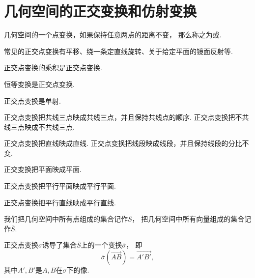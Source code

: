 \section{几何空间的正交变换和仿射变换}
\begin{definition}
几何空间的一个点变换，如果保持任意两点的距离不变，
那么称之为或.
\end{definition}

常见的正交点变换有平移、绕一条定直线旋转、关于给定平面的镜面反射等.

\begin{property}
正交点变换的乘积是正交点变换.
\end{property}

\begin{property}
恒等变换是正交点变换.
\end{property}

\begin{property}
正交点变换是单射.
\end{property}

\begin{property}
正交点变换把共线三点映成共线三点，并且保持共线点的顺序.
正交点变换把不共线三点映成不共线三点.
\end{property}

\begin{property}
正交点变换把直线映成直线.
正交点变换把线段映成线段，并且保持线段的分比不变.
\end{property}

\begin{property}
正交变换把平面映成平面.
\end{property}

\begin{property}
正交点变换把平行平面映成平行平面.
\end{property}

\begin{property}
正交点变换把平行直线映成平行直线.
\end{property}

我们把几何空间中所有点组成的集合记作\(S\)，
把几何空间中所有向量组成的集合记作\(\overline{S}\).
\begin{property}
正交点变换\(\sigma\)诱导了集合\(\overline{S}\)上的一个变换\(\overline{\sigma}\)，
即\begin{equation*}
	\overline{\sigma}(\vec{AB}) = \vec{A'B'},
\end{equation*}
其中\(A',B'\)是\(A,B\)在\(\sigma\)下的像.
\end{property}

